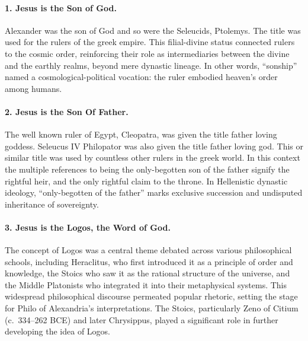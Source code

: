 \paragraph{1.
Jesus is the Son of God.}\label{par:jesus-is-the-son-of-god.}
Alexander was the son of God and so were the Seleucids, Ptolemys.
The title was used for the rulers of the greek empire.
This filial-divine status connected rulers to the cosmic order, reinforcing their role as intermediaries between the divine and the earthly realms, beyond mere dynastic lineage.
In other words, “sonship” named a cosmological-political vocation: the ruler embodied heaven’s order among humans.

\paragraph{2.
Jesus is the Son Of Father.}\label{par:jesus-is-the-son-of-father.}

The well known ruler of Egypt, Cleopatra, was given the title father loving goddess.
Seleucus IV Philopator was also given the title father loving god.
This or similar title was used by countless other rulers in the greek world.
In this context the multiple references to being the only-begotten son of the father signify the rightful heir, and the only rightful claim to the throne.
In Hellenistic dynastic ideology, “only-begotten of the father” marks exclusive succession and undisputed inheritance of sovereignty.

\paragraph{3.
Jesus is the Logos, the Word of God.}\label{par:jesus-is-the-logos-the-word-of-god.}
The concept of Logos was a central theme debated across various philosophical schools, including Heraclitus, who first introduced it as a principle of order and knowledge, the Stoics who saw it as the rational structure of the universe, and the Middle Platonists who integrated it into their metaphysical systems.
This widespread philosophical discourse permeated popular rhetoric, setting the stage for Philo of Alexandria’s interpretations.
The Stoics, particularly Zeno of Citium (c.~334–262 BCE) and later Chrysippus, played a significant role in further developing the idea of Logos.

